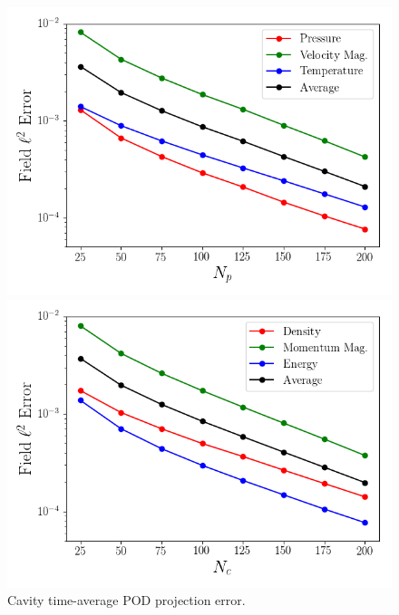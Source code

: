 \begin{figure}
	\begin{minipage}{0.49\linewidth}
		\includegraphics[width=0.99\linewidth,trim={0.5em 0.5em 0.5em 0.5em},clip]{Chapters/HPROMResults/Images/cavity/projection_error_primitive.png}
	\end{minipage}
	\begin{minipage}{0.49\linewidth}
		\includegraphics[width=0.99\linewidth,trim={0.5em 0.5em 0.5em 0.5em},clip]{Chapters/HPROMResults/Images/cavity/projection_error_conservative.png}
	\end{minipage}
	\caption{\label{fig:cavityProjErr}Cavity time-average POD projection error.}
\end{figure}

